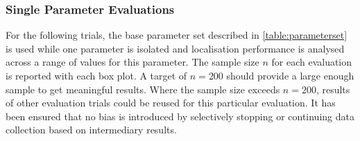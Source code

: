 \subsubsection{Single Parameter Evaluations}

For the following trials, the base parameter set described in \autoref{table:parameterset} is used while one parameter is isolated and localisation performance is analysed across a range of values for this parameter. The sample size $n$ for each evaluation is reported with each box plot. A target of $n=200$ should provide a large enough sample to get meaningful results. Where the sample size exceeds $n=200$, results of other evaluation trials could be reused for this particular evaluation. It has been ensured that no bias is introduced by selectively stopping or continuing data collection based on intermediary results.